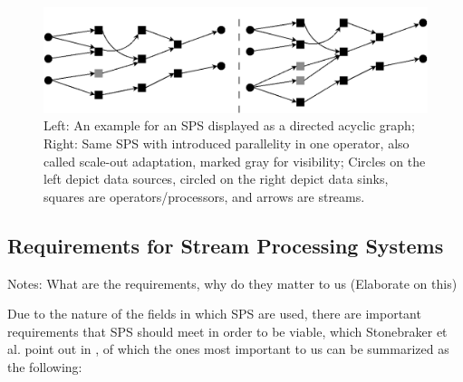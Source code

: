         \begin{figure}[h]
            \label{fig:sps_parallel_normal}
            \centering
            \includegraphics[width=1.0\textwidth]{Bilder/sps_parallel_normal.png}
            \caption{
                    Left: An example for an SPS displayed as a directed acyclic graph;
                    Right: Same SPS with introduced parallelity in one operator, also called scale-out adaptation, marked gray for visibility;
                    Circles on the left depict data sources, circled on the right depict data sinks, squares are operators/processors, and arrows are streams.
                    }
        \end{figure}

        \subsection{Requirements for Stream Processing Systems}
        \label{sub:requirements}

        Notes: What are the requirements, why do they matter to us (Elaborate on this)

        Due to the nature of the fields in which SPS are used, there are important requirements that SPS should meet in order to be viable, 
        which Stonebraker et al. point out in \cite{Stonebraker:2005:RRS:1107499.1107504}, of which the ones most important to us can be summarized as the following:
        
